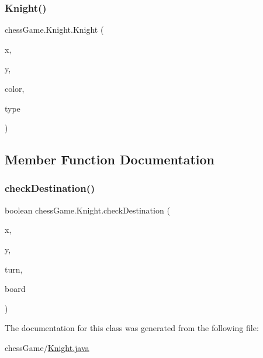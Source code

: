 \subsubsection{\texorpdfstring{Knight()}{Knight()}}
{\footnotesize\ttfamily chess\+Game.\+Knight.\+Knight (\begin{DoxyParamCaption}\item[{int}]{x,  }\item[{int}]{y,  }\item[{\hyperlink{classchess_game_1_1_piece_ad5117cbbbaebf3a27c4f3c2bcbd6678b}{color}}]{color,  }\item[{\hyperlink{classchess_game_1_1_piece_a1370c7f61581a1b72fa8ac2fd1af70a2}{type}}]{type }\end{DoxyParamCaption})}



\subsection{Member Function Documentation}
\hypertarget{classchess_game_1_1_knight_a30cf3ee38afa826f026d39ac83ef15d8}{}\label{classchess_game_1_1_knight_a30cf3ee38afa826f026d39ac83ef15d8} 
\subsubsection{\texorpdfstring{check\+Destination()}{checkDestination()}}
{\footnotesize\ttfamily boolean chess\+Game.\+Knight.\+check\+Destination (\begin{DoxyParamCaption}\item[{int}]{x,  }\item[{int}]{y,  }\item[{int}]{turn,  }\item[{\hyperlink{classchess_game_1_1_chess_board}{Chess\+Board}}]{board }\end{DoxyParamCaption})}



The documentation for this class was generated from the following file\+:\begin{DoxyCompactItemize}
\item 
chess\+Game/\hyperlink{_knight_8java}{Knight.\+java}\end{DoxyCompactItemize}
